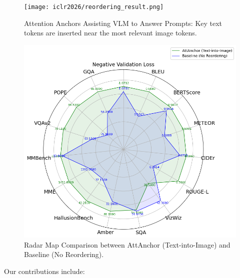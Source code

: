 \documentclass[11pt]{article}
\begin{document}
\begin{figure}[H]
    \centering
    \begin{minipage}{0.48\textwidth}
        \centering       \texttt{[image: iclr2026/reordering\_result.png]}
        \caption{Attention Anchors Assisting VLM to Answer Prompts: Key text tokens are inserted near the most relevant image tokens.}
        \label{fig:visual}
    \end{minipage}
    \hfill
    \begin{minipage}{0.51\textwidth}
        \centering        \includegraphics[width=\linewidth]{iclr2026/radar.png}
        \caption{Radar Map Comparison between AttAnchor (Text-into-Image) and Baseline (No Reordering).}
        \label{fig:radar}
    \end{minipage}
\end{figure}
\vspace{-0.5cm}
Our contributions include:
\end{document}
